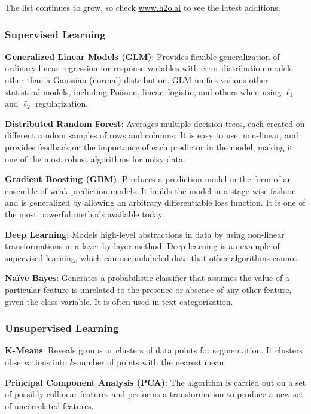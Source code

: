 {\begin{frame}
\begin{tabular}{p{5.0cm}p{6.0cm}}
\end{tabular}

\end{frame}

The list continues to grow, so check \url{www.h2o.ai} to see the latest additions. 

\subsubsection{Supervised Learning}


{\textbf{Generalized Linear Models (GLM)}}: Provides flexible generalization of ordinary linear regression for response variables with error distribution models other than a Gaussian (normal) distribution. GLM unifies various other statistical models, including Poisson, linear, logistic, and others when using $\ell_1$ and $\ell_2$ regularization.

{\textbf{Distributed Random Forest}}: Averages multiple decision trees, each created on different random samples of rows and columns. It is easy to use, non-linear, and provides feedback on the importance of each predictor in the model, making it one of the most robust algorithms for noisy data.

{\textbf{Gradient Boosting (GBM)}}: Produces a prediction model in the form of an ensemble of weak prediction models. It builds the model in a stage-wise fashion and is generalized by allowing an arbitrary differentiable loss function. It is one of the most powerful methods available today.

{\textbf{Deep Learning}}: Models high-level abstractions in data by using non-linear transformations in a layer-by-layer method. Deep learning is an example of supervised learning, which can use unlabeled data that other algorithms cannot.

{\textbf{Na\"{i}ve Bayes}}: Generates a probabilistic classifier that assumes the value of a particular feature is unrelated to the presence or absence of any other feature, given the class variable. It is often used in text categorization.

\subsubsection{Unsupervised Learning}
{\textbf{K-Means}}: Reveals groups or clusters of data points for segmentation. It clusters observations into $k$-number of points with the nearest mean.

{\textbf{Principal Component Analysis (PCA)}}: The algorithm is carried out on a set of possibly collinear features and performs a transformation to produce a new set of uncorrelated features.

}
